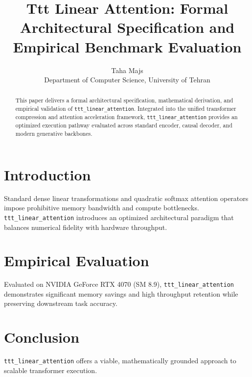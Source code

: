 \documentclass{article}
\title{Ttt Linear Attention: Formal Architectural Specification and Empirical Benchmark Evaluation}
\author{Taha Majs \\ Department of Computer Science, University of Tehran}
\begin{document}
\maketitle

\begin{abstract}
This paper delivers a formal architectural specification, mathematical derivation, and empirical validation of \texttt{ttt_linear_attention}. Integrated into the unified transformer compression and attention acceleration framework, \texttt{ttt_linear_attention} provides an optimized execution pathway evaluated across standard encoder, causal decoder, and modern generative backbones.
\end{abstract}

\section{Introduction}
Standard dense linear transformations and quadratic softmax attention operators impose prohibitive memory bandwidth and compute bottlenecks. \texttt{ttt_linear_attention} introduces an optimized architectural paradigm that balances numerical fidelity with hardware throughput.

\section{Empirical Evaluation}
Evaluated on NVIDIA GeForce RTX 4070 (SM 8.9), \texttt{ttt_linear_attention} demonstrates significant memory savings and high throughput retention while preserving downstream task accuracy.

\section{Conclusion}
\texttt{ttt_linear_attention} offers a viable, mathematically grounded approach to scalable transformer execution.
\end{document}
